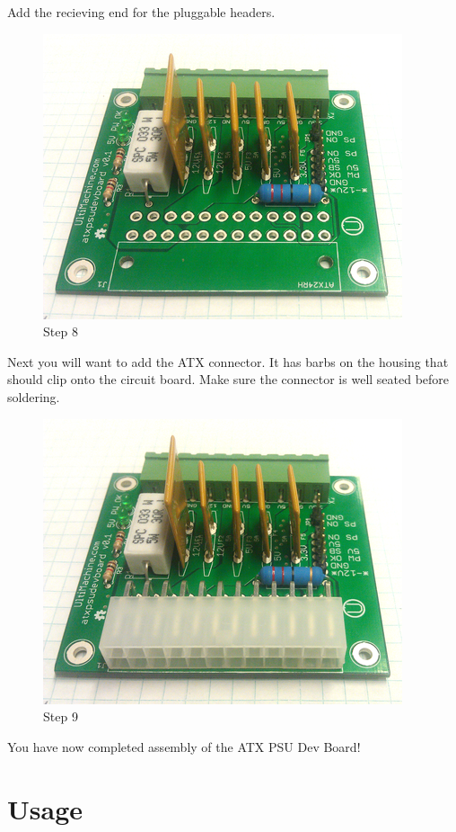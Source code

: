 Add the recieving end for the pluggable headers.

\begin{figure}[htbp]
\centering
\includegraphics{./png/step-08.png}
\caption{Step 8}
\end{figure}

Next you will want to add the ATX connector. It has barbs on the housing
that should clip onto the circuit board. Make sure the connector is well
seated before soldering.

\begin{figure}[htbp]
\centering
\includegraphics{./png/step-09.png}
\caption{Step 9}
\end{figure}

You have now completed assembly of the ATX PSU Dev Board!

\section{Usage}

